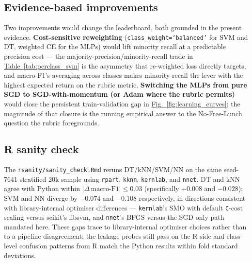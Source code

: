 \documentclass[conference]{IEEEtran}
\newcommand{\figref}[1]{\hyperref[#1]{\textcolor{denim_comp}{Fig.~\ref*{#1}}}}
\newcommand{\tabref}[1]{\hyperref[#1]{\textcolor{sage}{Table~\ref*{#1}}}}
\begin{document}
\subsection{Evidence-based improvements}\label{sec:disc:improve}
Two improvements would change the leaderboard, both grounded in the present
evidence. \textbf{Cost-sensitive reweighting} (\texttt{class\_weight=`balanced'}
for SVM and DT, weighted CE for the MLPs) would lift minority recall at a
predictable precision cost --- the majority-precision/minority-recall trade
in \tabref{tab:perclass_svm} is the asymmetry that re-weighted loss directly
targets, and macro-F1's averaging across classes makes minority-recall the
lever with the highest expected return on the rubric metric.
\textbf{Switching the MLPs from pure SGD to SGD-with-momentum (or Adam where
the rubric permits)} would close the persistent train-validation gap in
\figref{fig:learning_curves}; the magnitude of that closure is the running
empirical answer to the No-Free-Lunch question the rubric foregrounds.

\subsection{R sanity check}\label{sec:disc:rsanity}
The \texttt{rsanity/sanity\_check.Rmd} reruns DT/kNN/SVM/NN on the same
seed-7641 stratified 20k sample using \texttt{rpart}, \texttt{kknn},
\texttt{kernlab}, and \texttt{nnet}. DT and kNN agree with Python within
$|\Delta\,\text{macro-F1}|\le 0.03$ (specifically $+0.008$ and $-0.028$); SVM
and NN diverge by $-0.074$ and $-0.108$ respectively, in directions consistent
with library-internal optimiser differences --- \texttt{kernlab}'s SMO with
default \texttt{C}-cost scaling versus scikit's libsvm, and \texttt{nnet}'s
BFGS versus the SGD-only path mandated here. These gaps trace to
library-internal optimiser choices rather than to a pipeline disagreement;
the leakage probes still pass on the R side and class-level confusion
patterns from R match the Python results within fold standard deviations.

\end{document}
